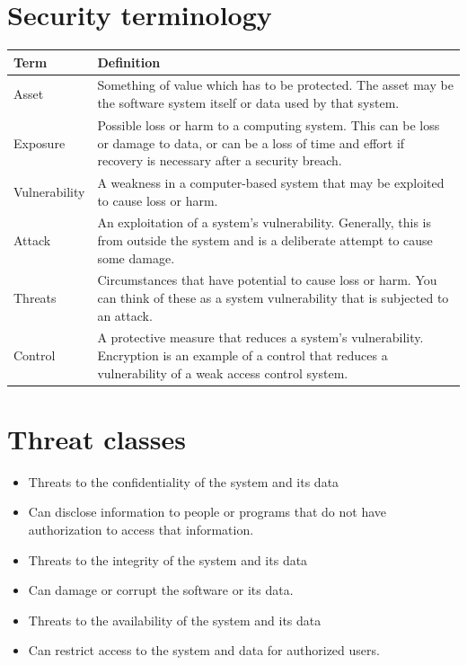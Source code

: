 \section{Security terminology}
\begin{table}[h!]
\centering
\begin{tabular}{ |p{3cm}|p{8cm}|  }
\hline
Term & Definition \\
\hline
\hline
Asset & Something of value which has to be protected. The asset may be the software system itself or data used by that system.\\
\hline
Exposure & Possible loss or harm to a computing system. This can be loss or damage to data, or can be a loss of time and effort if recovery is necessary after a security breach.\\
\hline
Vulnerability & A weakness in a computer-based system that may be exploited to cause loss or harm.\\
\hline
Attack & An exploitation of a system’s vulnerability. Generally, this is from outside the system and is a deliberate attempt to cause some damage.\\
\hline
Threats & Circumstances that have potential to cause loss or harm. You can think of these as a system vulnerability that is subjected to an attack.\\
\hline
Control & A protective measure that reduces a system’s vulnerability. Encryption is an example of a control that reduces a vulnerability of a weak access control system.\\
\hline
\end{tabular}

\label{table:T4_2}
\end{table}

\section{Threat classes}
\begin{itemize}
\item Threats to the confidentiality of the system and its data

  \item Can disclose information to people or programs that do not have authorization to access that information.

\item Threats to the integrity of the system and its data   \item Can damage or corrupt the software or its data.
\item Threats to the availability of the system and its data   \item Can restrict access to the system and data for authorized users.

\end{itemize}


